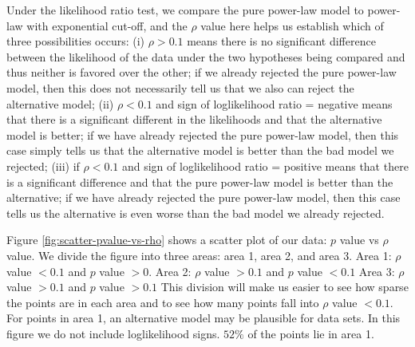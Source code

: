 \documentclass[10pt,conference,letterpaper,final]{IEEEtran}
\begin{document}
Under the likelihood ratio test, we compare the pure power-law model to power-law with exponential cut-off, and the $\rho$ value here helps us establish which of three possibilities occurs: (i) $\rho > 0.1$ means there is no significant difference between the likelihood of the data under the two hypotheses being compared and thus neither is favored over the other; if we already rejected the pure power-law model, then this does not necessarily tell us that we also can reject the alternative model; (ii) $\rho  < 0.1$ and sign of loglikelihood ratio = negative means that there is a significant different in the likelihoods and that the alternative model is better; if we have already rejected the pure power-law model, then this case simply tells us that the alternative model is better than the bad model we rejected; (iii) if $\rho < 0.1$ and sign of loglikelihood ratio = positive means that there is a significant difference and that the pure power-law model is better than the alternative; if we have already rejected the pure power-law model, then this case tells us the alternative is even worse than the bad model we already rejected.

Figure \ref{fig:scatter-pvalue-vs-rho} shows a scatter plot of our data: $p$ value vs $\rho$ value.
We divide the figure into three areas: area 1, area 2, and area 3.
Area 1: $\rho$ value $<0.1$ and $p$ value $>0$. 
Area 2: $\rho$ value $>0.1$ and $p$ value $<0.1$
Area 3: $\rho$ value $>0.1$ and  $p$ value $>0.1$ 
This division will make us easier to see how sparse the points are in each area and to see how many points fall into $\rho$ value $<0.1$.
For points in area 1, an alternative model may be plausible for data sets.
In this figure we do not include loglikelihood signs. 
$52\%$ of the points lie in area 1.
\end{document}
